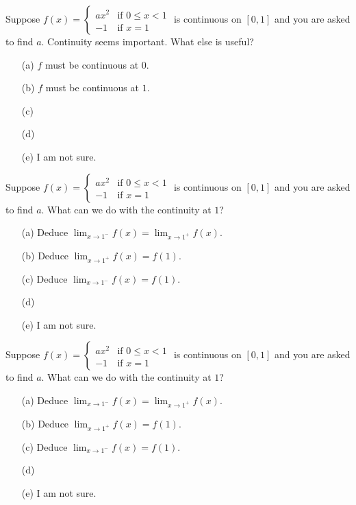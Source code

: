 \documentclass[14pt]{beamer}
\begin{document}
\begin{frame}[t]
  Suppose \(f(x) = \begin{cases} ax^{2} &\text{if } 0 \le x < 1 \\ -1 &\text{if } x = 1 \end{cases}\) is continuous on \([0,1]\) and you are asked to find \(a\). Continuity seems important. What else is useful?

  \medskip
  \begin{itemize} \setlength\itemsep{2ex}
    \item[(a)] \(f\) must be continuous at \(0\).
    \item[(b)] \(f\) must be continuous at \(1\).
    \item[(c)] 
    \item[(d)] 
    \item[(e)] I am not sure.
  \end{itemize} 
\end{frame}

\begin{frame}[t]
  Suppose \(f(x) = \begin{cases} ax^{2} &\text{if } 0 \le x < 1 \\ -1 &\text{if } x = 1 \end{cases}\) is continuous on \([0,1]\) and you are asked to find \(a\). What can we do with the continuity at \(1\)?

  \medskip
  \begin{itemize} \setlength\itemsep{2ex}
    \item[(a)] Deduce \(\lim_{x \to 1^{-}} f(x) = \lim_{x \to 1^{+}} f(x)\).
    \item[(b)] Deduce \(\lim_{x \to 1^{+}} f(x) = f(1)\).
    \item[(c)] Deduce \(\lim_{x \to 1^{-}} f(x) = f(1)\).
    \item[(d)] 
    \item[(e)] I am not sure.
  \end{itemize} 
\end{frame}

\begin{frame}[t]
  Suppose \(f(x) = \begin{cases} ax^{2} &\text{if } 0 \le x < 1 \\ -1 &\text{if } x = 1 \end{cases}\) is continuous on \([0,1]\) and you are asked to find \(a\). What can we do with the continuity at \(1\)?

  \medskip
  \begin{itemize} \setlength\itemsep{2ex}
    \item[(a)] Deduce \(\lim_{x \to 1^{-}} f(x) = \lim_{x \to 1^{+}} f(x)\).
    \item[(b)] Deduce \(\lim_{x \to 1^{+}} f(x) = f(1)\).
    \item[(c)] Deduce \(\lim_{x \to 1^{-}} f(x) = f(1)\).
    \item[(d)] 
    \item[(e)] I am not sure.
  \end{itemize} 
\end{frame}
\end{document}
